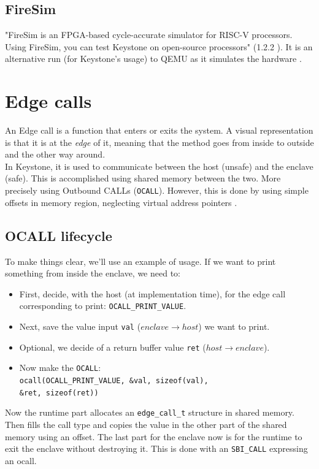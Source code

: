 \documentclass[11pt,a4paper]{report}
\begin{document}
\subsection{FireSim}
"FireSim is an FPGA-based cycle-accurate simulator for RISC-V processors. 
Using FireSim, you can test Keystone on open-source processors" (1.2.2 \cite{keystone-docs}).
It is an alternative run (for Keystone's usage) to QEMU as it simulates the hardware \cite{FireSim}.

\section{Edge calls}
\label{sub:edge-calls}
An Edge call is a function that enters or exits the system. 
A visual representation is that it is at the \textit{edge} of it, meaning that the method goes from inside to outside and the other way around.
\\

In Keystone, it is used to communicate between the host (unsafe) and the enclave (safe). 
This is accomplished using shared memory between the two. 
More precisely using Outbound CALLs (\texttt{OCALL}). 
However, this is done by using simple offsets in memory region, neglecting virtual address pointers
\cite{keystone-docs, review-keystone}.

\subsection{OCALL lifecycle}
To make things clear, we'll use an example of usage. 
If we want to print something from inside the enclave, we need to: 

\begin{itemize}
    \item First, decide, with the host (at implementation time), for the edge call corresponding to print: \texttt{OCALL\_PRINT\_VALUE}. 
    \item Next, save the value input \texttt{val} ($enclave\rightarrow host$) we want to print.
    \item Optional, we decide of a return buffer value \texttt{ret} ($host \rightarrow enclave$).
    \item Now make the \texttt{OCALL}: \\
    \texttt{ocall(OCALL\_PRINT\_VALUE, \&val, sizeof(val), }\\
    \texttt{\&ret, sizeof(ret))}
\end{itemize}

Now the runtime part allocates an \texttt{edge\_call\_t} structure in shared memory. 
Then fills the call type and copies the value in the other part of the shared memory using an offset.
The last part for the enclave now is for the runtime to exit the enclave without destroying it. 
This is done with an \texttt{SBI\_CALL} expressing an ocall.
\end{document}
